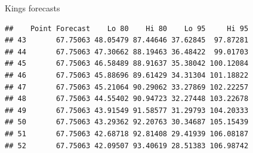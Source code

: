 \begin{frame}[fragile]{Kings forecasts}
  
\begin{knitrout}
\color{fgcolor}\begin{kframe}
\begin{alltt}
\hlkwb{=}
\end{alltt}
\begin{verbatim}
##    Point Forecast    Lo 80    Hi 80    Lo 95     Hi 95
## 43       67.75063 48.05479 87.44646 37.62845  97.87281
## 44       67.75063 47.30662 88.19463 36.48422  99.01703
## 45       67.75063 46.58489 88.91637 35.38042 100.12084
## 46       67.75063 45.88696 89.61429 34.31304 101.18822
## 47       67.75063 45.21064 90.29062 33.27869 102.22257
## 48       67.75063 44.55402 90.94723 32.27448 103.22678
## 49       67.75063 43.91549 91.58577 31.29793 104.20333
## 50       67.75063 43.29362 92.20763 30.34687 105.15439
## 51       67.75063 42.68718 92.81408 29.41939 106.08187
## 52       67.75063 42.09507 93.40619 28.51383 106.98742
\end{verbatim}
\end{kframe}
\end{knitrout}
  
\end{frame}


